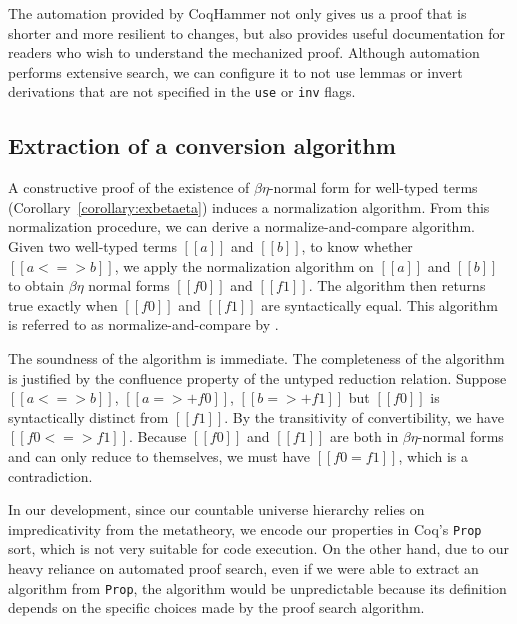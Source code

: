 \documentclass[\ifpublic nolinenum\else\fi,online,OA]{jfp}
\theoremstyle{definition}
\begin{document}
The automation provided by CoqHammer not only gives us a proof that is shorter
and more resilient to changes, but also provides useful documentation for
readers who wish to understand the mechanized proof. Although automation
performs extensive search, we can configure it to not use lemmas or invert derivations that
are not specified in the \texttt{use} or \texttt{inv} flags.

\ifextended
\subsection{Extraction of a conversion algorithm}
\label{sec:conversionalgo}
A constructive proof of the existence of $\beta\eta$-normal form
for well-typed terms (Corollary~\ref{corollary:exbetaeta}) induces a
normalization algorithm. From this normalization procedure, we can
derive a normalize-and-compare algorithm. Given two well-typed terms
$[[a]]$ and $[[b]]$, to know whether $[[a <=> b]]$, we apply the
normalization algorithm on $[[a]]$ and $[[b]]$ to obtain $\beta\eta$
normal forms $[[f0]]$ and $[[f1]]$. The algorithm then returns true
exactly when $[[f0]]$ and $[[f1]]$ are syntactically equal. This
algorithm is referred to as normalize-and-compare by
\citet{pierce2004advanced}.

The soundness of the algorithm is immediate. The completeness of the
algorithm is justified by the confluence property of the untyped
reduction relation. Suppose $[[a <=> b]]$, $[[a =>+ f0]]$, $[[b =>+
f1]]$ but $[[f0]]$ is syntactically distinct from $[[f1]]$. By the transitivity of convertibility, we have $[[f0 <=> f1]]$.
Because $[[f0]]$ and $[[f1]]$ are both in
$\beta\eta$-normal forms and can only reduce to themselves, we must
have $[[f0 = f1]]$, which is a contradiction.

In our development, since our countable universe hierarchy
relies on impredicativity from the metatheory, we encode our
properties in Coq's \texttt{Prop} sort, which is not very suitable for
code execution. On the other hand, due to our heavy reliance on
automated proof search, even if we were able to extract an algorithm from \texttt{Prop},
the algorithm would be unpredictable because its definition depends on
the specific choices made by the proof search algorithm.
\end{document}
